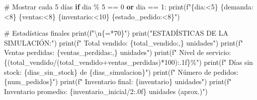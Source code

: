 \documentclass[
  doc,
  floatsintext,
  longtable,
  a4paper,
  nolmodern,
  notxfonts,
  notimes,
  12pt,
  colorlinks=true,linkcolor=blue,citecolor=blue,urlcolor=blue]{apa7}
\newenvironment{Shaded}{\begin{snugshade}}{\end{snugshade}}
\newcommand{\BuiltInTok}[1]{\textcolor[rgb]{0.00,0.23,0.31}{#1}}
\newcommand{\CharTok}[1]{\textcolor[rgb]{0.13,0.47,0.30}{#1}}
\newcommand{\CommentTok}[1]{\textcolor[rgb]{0.37,0.37,0.37}{#1}}
\newcommand{\ControlFlowTok}[1]{\textcolor[rgb]{0.00,0.23,0.31}{\textbf{#1}}}
\newcommand{\DecValTok}[1]{\textcolor[rgb]{0.68,0.00,0.00}{#1}}
\newcommand{\KeywordTok}[1]{\textcolor[rgb]{0.00,0.23,0.31}{\textbf{#1}}}
\newcommand{\NormalTok}[1]{\textcolor[rgb]{0.00,0.23,0.31}{#1}}
\newcommand{\OperatorTok}[1]{\textcolor[rgb]{0.37,0.37,0.37}{#1}}
\newcommand{\SpecialCharTok}[1]{\textcolor[rgb]{0.37,0.37,0.37}{#1}}
\newcommand{\SpecialStringTok}[1]{\textcolor[rgb]{0.13,0.47,0.30}{#1}}
\newcommand{\StringTok}[1]{\textcolor[rgb]{0.13,0.47,0.30}{#1}}
\begin{document}
\begin{Shaded}
\begin{Highlighting}[]
        \CommentTok{\# Mostrar cada 5 días}
        \ControlFlowTok{if}\NormalTok{ dia }\OperatorTok{\%} \DecValTok{5} \OperatorTok{==} \DecValTok{0} \KeywordTok{or}\NormalTok{ dia }\OperatorTok{==} \DecValTok{1}\NormalTok{:}
            \BuiltInTok{print}\NormalTok{(}\SpecialStringTok{f"}\SpecialCharTok{\{}\NormalTok{dia}\SpecialCharTok{:\textless{}5\}}\SpecialStringTok{ }\SpecialCharTok{\{}\NormalTok{demanda}\SpecialCharTok{:\textless{}8\}}\SpecialStringTok{ }\SpecialCharTok{\{}\NormalTok{ventas}\SpecialCharTok{:\textless{}8\}}\SpecialStringTok{ }\SpecialCharTok{\{}\NormalTok{inventario}\SpecialCharTok{:\textless{}10\}}\SpecialStringTok{ }\SpecialCharTok{\{}\NormalTok{estado\_pedido}\SpecialCharTok{:\textless{}8\}}\SpecialStringTok{"}\NormalTok{)}
    
    \CommentTok{\# Estadísticas finales}
    \BuiltInTok{print}\NormalTok{(}\SpecialStringTok{f"}\CharTok{\textbackslash{}n}\SpecialCharTok{\{}\StringTok{\textquotesingle{}=\textquotesingle{}}\OperatorTok{*}\DecValTok{70}\SpecialCharTok{\}}\SpecialStringTok{"}\NormalTok{)}
    \BuiltInTok{print}\NormalTok{(}\StringTok{"ESTADÍSTICAS DE LA SIMULACIÓN:"}\NormalTok{)}
    \BuiltInTok{print}\NormalTok{(}\SpecialStringTok{f"  Total vendido: }\SpecialCharTok{\{}\NormalTok{total\_vendido}\SpecialCharTok{:,\}}\SpecialStringTok{ unidades"}\NormalTok{)}
    \BuiltInTok{print}\NormalTok{(}\SpecialStringTok{f"  Ventas perdidas: }\SpecialCharTok{\{}\NormalTok{ventas\_perdidas}\SpecialCharTok{:,\}}\SpecialStringTok{ unidades"}\NormalTok{)}
    \BuiltInTok{print}\NormalTok{(}\SpecialStringTok{f"  Nivel de servicio: }\SpecialCharTok{\{}\NormalTok{(total\_vendido}\OperatorTok{/}\NormalTok{(total\_vendido}\OperatorTok{+}\NormalTok{ventas\_perdidas)}\OperatorTok{*}\DecValTok{100}\NormalTok{)}\SpecialCharTok{:.1f\}}\SpecialStringTok{\%"}\NormalTok{)}
    \BuiltInTok{print}\NormalTok{(}\SpecialStringTok{f"  Días sin stock: }\SpecialCharTok{\{}\NormalTok{dias\_sin\_stock}\SpecialCharTok{\}}\SpecialStringTok{ de }\SpecialCharTok{\{}\NormalTok{dias\_simulacion}\SpecialCharTok{\}}\SpecialStringTok{"}\NormalTok{)}
    \BuiltInTok{print}\NormalTok{(}\SpecialStringTok{f"  Número de pedidos: }\SpecialCharTok{\{}\NormalTok{num\_pedidos}\SpecialCharTok{\}}\SpecialStringTok{"}\NormalTok{)}
    \BuiltInTok{print}\NormalTok{(}\SpecialStringTok{f"  Inventario final: }\SpecialCharTok{\{}\NormalTok{inventario}\SpecialCharTok{\}}\SpecialStringTok{ unidades"}\NormalTok{)}
    \BuiltInTok{print}\NormalTok{(}\SpecialStringTok{f"  Inventario promedio: }\SpecialCharTok{\{}\NormalTok{inventario\_inicial}\OperatorTok{/}\DecValTok{2}\SpecialCharTok{:.0f\}}\SpecialStringTok{ unidades (aprox.)"}\NormalTok{)}


\end{Highlighting}
\end{Shaded}
\end{document}
